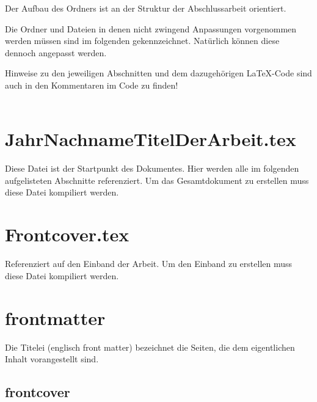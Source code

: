 Der Aufbau des Ordners ist an der Struktur der Abschlussarbeit orientiert. 

Die Ordner und Dateien in denen nicht zwingend Anpassungen vorgenommen werden müssen sind im folgenden gekennzeichnet. Natürlich können diese dennoch angepasst werden.

Hinweise zu den jeweiligen Abschnitten und dem dazugehörigen LaTeX-Code sind auch in den Kommentaren im Code zu finden!\\ 
\\


\section*{JahrNachnameTitelDerArbeit.tex}

Diese Datei ist der Startpunkt des Dokumentes. Hier werden alle im folgenden aufgelisteten Abschnitte referenziert. Um das Gesamtdokument zu erstellen muss diese Datei kompiliert werden.

\section*{Frontcover.tex}

Referenziert auf den Einband der Arbeit. Um den Einband zu erstellen muss diese Datei kompiliert werden.

\newpage

\section*{frontmatter}

Die Titelei (englisch front matter) bezeichnet die Seiten, die dem eigentlichen Inhalt vorangestellt sind.

\subsection*{frontcover}
\label{section:_01_frontcover}

